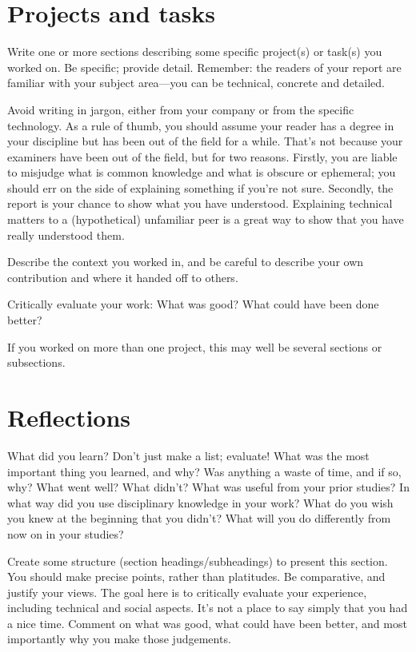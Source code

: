 \documentclass[12pt,a4paper,twoside,openright]{report}
\begin{document}
\section{Projects and tasks}

Write one or more sections describing some specific project(s) or task(s) you worked on.
Be specific; provide detail.
Remember: the readers of your report are familiar with your subject area---you can be technical,
concrete and detailed.

Avoid writing in jargon, either from your company or from the specific technology.
As a rule of thumb, you should assume your reader has a degree in your discipline
but has been out of the field for a while.
That's not because your examiners have been out of the field, but for two reasons.
Firstly, you are liable to misjudge what is common knowledge and what is obscure or ephemeral;
you should err on the side of explaining something if you're not sure.
Secondly, the report is your chance to show what you have understood.
Explaining technical matters to a (hypothetical) unfamiliar peer
is a great way to show that you have really understood them.

Describe the context you worked in, and be careful to describe your own contribution
and where it handed off to others.

Critically evaluate your work: What was good? What could have been done better?

If you worked on more than one project, this may well be several sections or subsections.

\section{Reflections}

What did you learn? Don't just make a list; evaluate!
What was the most important thing you learned, and why?
Was anything a waste of time, and if so, why?
What went well? What didn't?
What was useful from your prior studies?
In what way did you use disciplinary knowledge in your work?
What do you wish you knew at the beginning that you didn't?
What will you do differently from now on in your studies?

Create some structure (section headings/subheadings) to present this section.
You should make precise points, rather than platitudes.
Be comparative, and justify your views.
The goal here is to critically evaluate your experience,
including technical and social aspects.
It's not a place to say simply that you had a nice time.
Comment on what was good, what could have been better,
and most importantly why you make those judgements.
\end{document}
